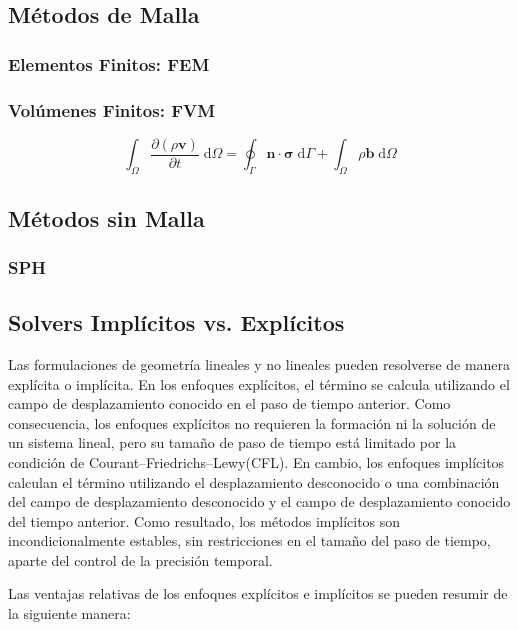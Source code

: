 \documentclass{article}
\begin{document}
\subsection{Métodos de Malla}
\subsubsection{Elementos Finitos: FEM}

\subsubsection{Volúmenes Finitos: FVM}
\begin{equation}
\int_\Omega \frac{\partial (\rho \boldsymbol{v})}{\partial t} \; \text{d}\Omega = \oint_\Gamma \boldsymbol{n} \cdot \boldsymbol{\sigma} \; \text{d}\Gamma + \int_\Omega \rho \boldsymbol{b} \; \text{d}\Omega
\end{equation}

\subsection{Métodos sin Malla}

\subsubsection{SPH}

\subsection{Solvers Implícitos vs. Explícitos}

Las formulaciones de geometría lineales y no lineales pueden resolverse de manera explícita o implícita. En los enfoques explícitos, el término se calcula utilizando el campo de desplazamiento conocido en el paso de tiempo anterior. Como consecuencia, los enfoques explícitos no requieren la formación ni la solución de un sistema lineal, pero su tamaño de paso de tiempo está limitado por la condición de Courant–Friedrichs–Lewy(CFL). En cambio, los enfoques implícitos calculan el término utilizando el desplazamiento desconocido o una combinación del campo de desplazamiento desconocido y el campo de desplazamiento conocido del tiempo anterior. Como resultado, los métodos implícitos son incondicionalmente estables, sin restricciones en el tamaño del paso de tiempo, aparte del control de la precisión temporal.

Las ventajas relativas de los enfoques explícitos e implícitos se pueden resumir de la siguiente manera:
\end{document}
